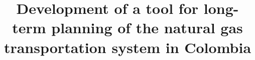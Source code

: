 \documentclass[aspectratio=169,12pt]{beamer}
\title[Natural gas transportation tool]{Development of a tool for long-term planning of the natural gas transportation system in Colombia}
\begin{document}
	
	\begin{frame}
		\titlepage
	\end{frame}
	
\end{document}
